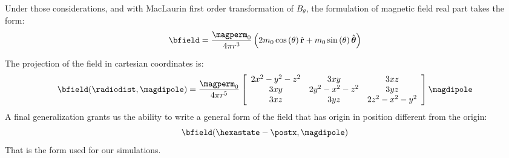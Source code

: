 Under those considerations, and with MacLaurin first order transformation of $B_{\theta}$, the formulation of magnetic field real part takes the form:
\begin{equation}
\bfield = \dfrac{\magperm_0}{4 \pi r^3} \braces{ 2 m_0 \ccos{\theta} \vers{r} + m_0 \ssin{\theta} \vrtheta }
\label{eq:magneticfieldpolar}
\end{equation}

The projection of the field in cartesian coordinates is:
\begin{equation}
\bfield(\radiodist,\magdipole) = \dfrac{\magperm_0}{4 \pi r^5} \magfieldmatrix \magdipole
\end{equation}
A final generalization grants us the ability to write a general form of the field that has origin in position different from the origin:
\begin{equation}
\bfield(\hexastate - \postx,\magdipole)
\end{equation}
That is the form used for our simulations.